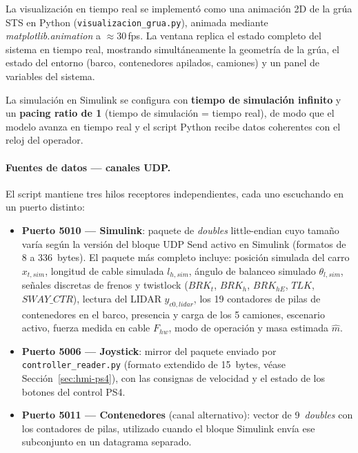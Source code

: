 \documentclass[12pt, a4paper]{article}
\begin{document}
La visualización en tiempo real se implementó como una animación 2D de la grúa STS
en Python (\texttt{visualizacion\_grua.py}), animada mediante
\textit{matplotlib.animation} a $\approx 30$\,fps. La ventana replica el estado
completo del sistema en tiempo real, mostrando simultáneamente la geometría de la
grúa, el estado del entorno (barco, contenedores apilados, camiones) y un panel de
variables del sistema.

La simulación en Simulink se configura con \textbf{tiempo de simulación infinito} y
un \textbf{pacing ratio de 1} (tiempo de simulación = tiempo real), de modo que el
modelo avanza en tiempo real y el script Python recibe datos coherentes con el reloj
del operador.

\paragraph{Fuentes de datos — canales UDP.}\leavevmode

El script mantiene tres hilos receptores independientes, cada uno escuchando en un
puerto distinto:

\begin{itemize}
    \item \textbf{Puerto 5010 — Simulink}: paquete de \textit{doubles} little-endian
    cuyo tamaño varía según la versión del bloque UDP Send activo en Simulink
    (formatos de 8 a 336~bytes). El paquete más completo incluye:
    posición simulada del carro $x_{t,sim}$, longitud de cable simulada $l_{h,sim}$,
    ángulo de balanceo simulado $\theta_{l,sim}$, señales discretas de frenos y
    twistlock ($BRK_t$, $BRK_h$, $BRK_{hE}$, $TLK$, $SWAY\_CTR$), lectura del
    LIDAR $y_{c0,lidar}$, los 19 contadores de pilas de contenedores en el barco,
    presencia y carga de los 5 camiones, escenario activo, fuerza medida en cable
    $F_{hw}$, modo de operación y masa estimada $\hat{m}$.

    \item \textbf{Puerto 5006 — Joystick}: mirror del paquete enviado por
    \texttt{controller\_reader.py} (formato extendido de 15~bytes, véase
    Sección~\ref{sec:hmi-ps4}), con las consignas de velocidad y el estado de los
    botones del control PS4.

    \item \textbf{Puerto 5011 — Contenedores} (canal alternativo): vector de
    9~\textit{doubles} con los contadores de pilas, utilizado cuando el bloque
    Simulink envía ese subconjunto en un datagrama separado.
\end{itemize}
\end{document}
